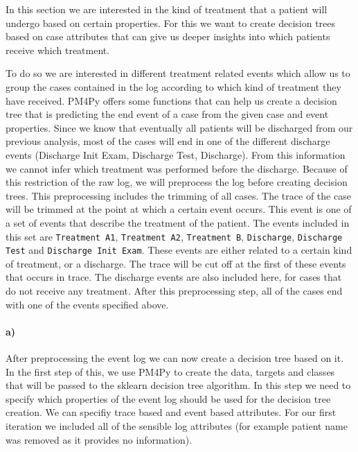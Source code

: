 \documentclass[12pt]{report}
\begin{document}
In this section we are interested in the kind of treatment that a patient will undergo based on certain properties. For this we want to create decision trees based on case attributes that can give us deeper insights into which patients receive which treatment.

To do so we are interested in different treatment related events which allow us to group the cases contained in the log according to which kind of treatment they have received. PM4Py offers some functions that can help us create a decision tree that is predicting the end event of a case from the given case and event properties. Since we know that eventually all patients will be discharged from our previous analysis, most of the cases will end in one of the different discharge events (Discharge Init Exam, Discharge Test, Discharge). From this information we cannot infer which treatment was performed before the discharge. Because of this restriction of the raw log, we will preprocess the log before creating decision trees. This preprocessing includes the trimming of all cases. The trace of the case will be trimmed at the point at which a certain event occurs. This event is one of a set of events that describe the treatment of the patient. The events included in this set are \texttt{Treatment A1}, \texttt{Treatment A2}, \texttt{Treatment B}, \texttt{Discharge}, \texttt{Discharge Test} and \texttt{Discharge Init Exam}. These events are either related to a certain kind of treatment, or a discharge. The trace will be cut off at the first of these events that occurs in trace. The discharge events are also included here, for cases that do not receive any treatment. After this preprocessing step, all of the cases end with one of the events specified above.

\paragraph{a)} 
After preprocessing the event log we can now create a decision tree based on it. In the first step of this, we use PM4Py to create the data, targets and classes that will be passed to the sklearn decision tree algorithm. In this step we need to specify which properties of the event log should be used for the decision tree creation. We can specifiy trace based and event based attributes. For our first iteration we included all of the sensible log attributes (for example patient name was removed as it provides no information).
\end{document}
